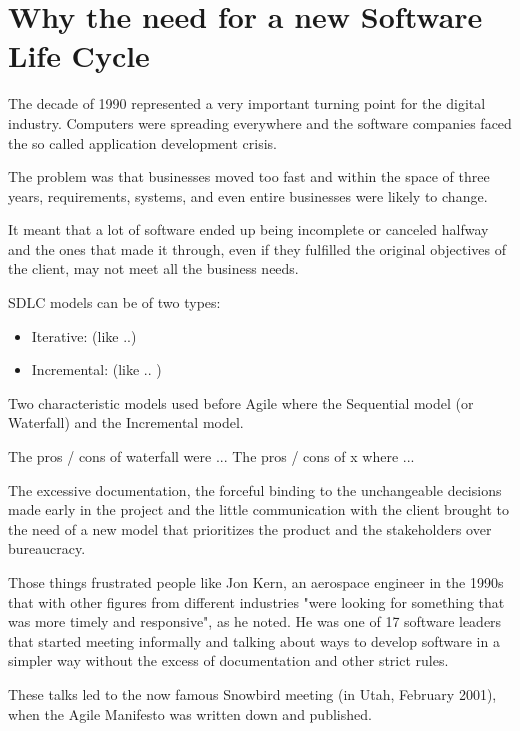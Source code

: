 \section{Why the need for a new Software Life Cycle}

	The decade of 1990 represented a very important turning point for the digital industry.
	Computers were spreading everywhere and the software companies faced the so called application development crisis.
	
	The problem was that businesses moved too fast and within the space of three years, requirements, systems, and even entire businesses were likely to change. %
	
	It meant that a lot of software ended up being incomplete or canceled halfway and the ones that made it through, even if they fulfilled the original objectives of the client, may not meet all the business needs.

	SDLC models can be of two types:
	\begin{itemize}
		\item Iterative: (like ..)
		\item Incremental: (like .. )
	\end{itemize}
	
	Two characteristic models used before Agile where the Sequential model (or Waterfall) and the Incremental model.

	The pros / cons of waterfall were ... 
	The pros / cons of x where ...

	The excessive documentation, the forceful binding to the unchangeable decisions made early in the project and the little communication with the client brought to the need of a new model that prioritizes the product and the stakeholders over bureaucracy. 

	Those things frustrated people like Jon Kern, an aerospace engineer in the 1990s that with other figures from different industries "were looking for something that was more timely and responsive", as he noted.
	He was one of 17 software leaders that started meeting informally and talking about ways to develop software in a simpler way without the excess of documentation and other strict rules.

	These talks led to the now famous Snowbird meeting (in Utah, February 2001), when the Agile Manifesto was written down and published.

